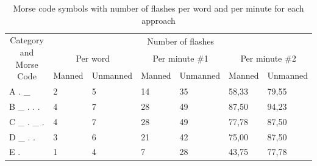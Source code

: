 \begin{table}[!htb]
\centering
\caption[Morse code symbols with number of flashes per word and per minute for each approach]{Morse code symbols with number of flashes per word and per minute for each approach}
\label{tab:morsefrequency2}
\begin{tabular}{@{}lllllll@{}}
\toprule
\multicolumn{1}{c}{\multirow{3}{*}{Category and Morse Code}} & \multicolumn{6}{c}{Number of flashes}                                                                                                                                              \\ \cmidrule(l){2-7} 
\multicolumn{1}{c}{}                                         & \multicolumn{2}{c}{Per word}                              & \multicolumn{2}{c}{Per minute \#1}                        & \multicolumn{2}{c}{Per minute \#2}                        \\
\multicolumn{1}{c}{}                                         & \multicolumn{1}{c}{Manned} & \multicolumn{1}{c}{Unmanned} & \multicolumn{1}{c}{Manned} & \multicolumn{1}{c}{Unmanned} & \multicolumn{1}{c}{Manned} & \multicolumn{1}{c}{Unmanned} \\ \cmidrule(r){1-1}
A . \_                                                       & 2                          & 5                            & 14                         & 35                           & 58,33                      & 79,55                        \\
B \_ . . .                                                   & 4                          & 7                            & 28                         & 49                           & 87,50                      & 94,23                        \\
C \_ . \_ .                                                  & 4                          & 7                            & 28                         & 49                           & 77,78                      & 87,50                        \\
D \_ . .                                                     & 3                          & 6                            & 21                         & 42                           & 75,00                      & 87,50                        \\
E .                                                          & 1                          & 4                            & 7                          & 28                           & 43,75                      & 77,78                        \\

\end{tabular}
\end{table}
